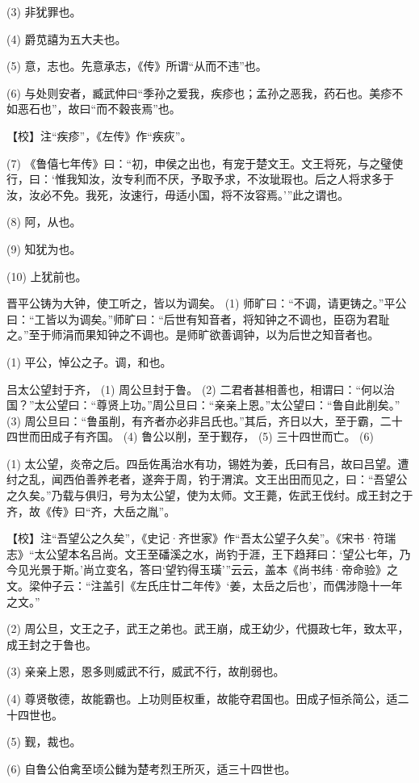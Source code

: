 \documentclass[12pt,UTF8]{ctexbook}
\begin{document}
(3) 非犹罪也。

(4) 爵苋譆为五大夫也。

(5) 意，志也。先意承志，《传》所谓“从而不违”也。

(6) 与处则安者，臧武仲曰“季孙之爱我，疾疹也；孟孙之恶我，药石也。美疹不如恶石也”，故曰“而不穀丧焉”也。

【校】注“疾疹”，《左传》作“疾疢”。

(7) 《鲁僖七年传》曰：“初，申侯之出也，有宠于楚文王。文王将死，与之璧使行，曰：‘惟我知汝，汝专利而不厌，予取予求，不汝玼瑕也。后之人将求多于汝，汝必不免。我死，汝速行，毋适小国，将不汝容焉。’”此之谓也。

(8) 阿，从也。

(9) 知犹为也。

(10) 上犹前也。

晋平公铸为大钟，使工听之，皆以为调矣。 (1) 师旷曰：“不调，请更铸之。”平公曰：“工皆以为调矣。”师旷曰：“后世有知音者，将知钟之不调也，臣窃为君耻之。”至于师涓而果知钟之不调也。是师旷欲善调钟，以为后世之知音者也。

(1) 平公，悼公之子。调，和也。

吕太公望封于齐， (1) 周公旦封于鲁。 (2) 二君者甚相善也，相谓曰：“何以治国？”太公望曰：“尊贤上功。”周公旦曰：“亲亲上恩。”太公望曰：“鲁自此削矣。” (3) 周公旦曰：“鲁虽削，有齐者亦必非吕氏也。”其后，齐日以大，至于霸，二十四世而田成子有齐国。 (4) 鲁公以削，至于觐存， (5) 三十四世而亡。 (6)

(1) 太公望，炎帝之后。四岳佐禹治水有功，锡姓为姜，氏曰有吕，故曰吕望。遭纣之乱，闻西伯善养老者，遂奔于周，钓于渭滨。文王出田而见之，曰：“吾望公之久矣。”乃载与俱归，号为太公望，使为太师。文王薨，佐武王伐纣。成王封之于齐，故《传》曰“齐，大岳之胤”。

【校】注“吾望公之久矣”，《史记·齐世家》作“吾太公望子久矣”。《宋书·符瑞志》“太公望本名吕尚。文王至磻溪之水，尚钓于涯，王下趋拜曰：‘望公七年，乃今见光景于斯。’尚立变名，答曰‘望钓得玉璜’”云云，盖本《尚书纬·帝命验》之文。梁仲子云：“注盖引《左氏庄廿二年传》‘姜，太岳之后也’，而偶涉隐十一年之文。”

(2) 周公旦，文王之子，武王之弟也。武王崩，成王幼少，代摄政七年，致太平，成王封之于鲁也。

(3) 亲亲上恩，恩多则威武不行，威武不行，故削弱也。

(4) 尊贤敬德，故能霸也。上功则臣权重，故能夺君国也。田成子恒杀简公，适二十四世也。

(5) 觐，裁也。

(6) 自鲁公伯禽至顷公雠为楚考烈王所灭，适三十四世也。
\end{document}
